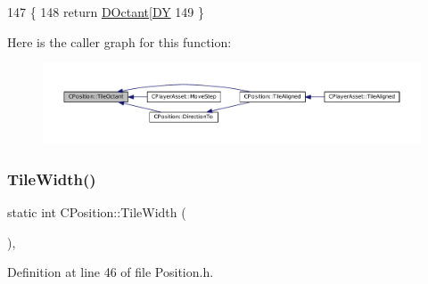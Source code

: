 \begin{DoxyCode}
147                                       \{
148     \textcolor{keywordflow}{return} \hyperlink{classCPosition_a0f7a420e82a180b983e32258729bb984}{DOctant}[\hyperlink{classCPosition_a84139c9e8eb547e7cf3cb851739943a4}{DY} %
149 \}
\end{DoxyCode}
Here is the caller graph for this function\+:\nopagebreak
\begin{figure}[H]
\begin{center}
\leavevmode
\includegraphics[width=350pt]{classCPosition_a6acbc9445751b0a040c2971720f00088_icgraph}
\end{center}
\end{figure}
\hypertarget{classCPosition_a27a7a8b9a5541da0aa8d97d785650fb8}{}\label{classCPosition_a27a7a8b9a5541da0aa8d97d785650fb8} 
\subsubsection{\texorpdfstring{Tile\+Width()}{TileWidth()}}
{\footnotesize\ttfamily static int C\+Position\+::\+Tile\+Width (\begin{DoxyParamCaption}{ }\end{DoxyParamCaption})\hspace{0.3cm}{\ttfamily [inline]}, {\ttfamily [static]}}



Definition at line 46 of file Position.\+h.


